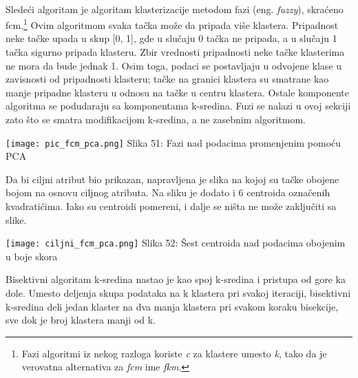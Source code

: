 \documentclass[a4paper]{article}
\begin{document}
{\vphantom{a}\\
\noindent\begin{minipage}{0.4\textwidth}
Sledeći algoritam je algoritam klasterizacije metodom fazi (eng. {\em fuzzy}), skraćeno fcm.\footnote[7]{Fazi algoritmi iz nekog razloga koriste {\em c} za klastere umesto {\em k}, tako da je verovatna alternativa za {\em fcm} ime {\em fkm}.} Ovim algoritmom svaka tačka može da pripada više klastera. Pripadnost neke tačke upada u skup [0, 1], gde u slučaju 0 tačka ne pripada, a u slučaju 1 tačka sigurno pripada klasteru. Zbir vrednosti pripadnosti neke tačke klasterima ne mora da bude jednak 1. Osim toga, podaci se postavljaju u odvojene klase u zavisnosti od pripadnosti klasteru; tačke na granici klastera su smatrane kao manje pripadne klasteru u odnosu na tačke u centru klastera. Ostale komponente algoritma se podudaraju sa komponentama k-sredina. Fuzi se nalazi u ovoj sekciji zato što se smatra modifikacijom k-sredina, a ne zasebnim algoritmom.
\end{minipage}
\noindent\begin{minipage}{0.05\textwidth}
\hphantom{a}
\end{minipage}
\noindent\begin{minipage}{0.48\textwidth}
\texttt{[image: pic\_fcm\_pca.png]}
Slika 51: Fazi nad podacima promenjenim pomoću PCA\\
\end{minipage}

\noindent\begin{minipage}{0.45\textwidth}
Da bi ciljni atribut bio prikazan, napravljena je slika na kojoj su tačke obojene bojom na osnovu ciljnog atributa. Na sliku je dodato i 6 centroida označenih kvadratićima. Iako su centroidi pomereni, i dalje se ništa ne može zaključiti sa slike. \\
\end{minipage}
\noindent\begin{minipage}{0.01\textwidth}
\hphantom{a}
\end{minipage}
\noindent\begin{minipage}{0.6\textwidth}
\texttt{[image: ciljni\_fcm\_pca.png]}
Slika 52: Šest centroida nad podacima obojenim u boje skora\\
\end{minipage}

Bisektivni algoritam k-sredina nastao je kao spoj k-sredina i pristupa od gore ka dole. Umesto deljenja skupa podataka na k klastera pri svakoj iteraciji, bisektivni k-sredina deli jedan klaster na dva manja klastera pri svakom koraku bisekcije, sve dok je broj klastera manji od k.\\

}
\end{document}
